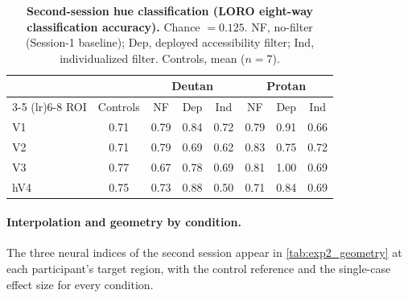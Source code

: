 \begin{table}[tb]
  \centering
  \caption{\textbf{Second-session hue classification (LORO eight-way classification accuracy).} Chance $= 0.125$. NF, no-filter (Session-1 baseline); Dep, deployed accessibility filter; Ind, individualized filter. Controls, mean ($n = 7$).}
  \label{tab:exp2_loro}
  \begin{tabular}{lccccccc}
    \toprule
     & & \multicolumn{3}{c}{Deutan} & \multicolumn{3}{c}{Protan} \\
    \cmidrule(lr){3-5} \cmidrule(lr){6-8}
    ROI & Controls & NF & Dep & Ind & NF & Dep & Ind \\
    \midrule
    V1  & 0.71 & 0.79 & 0.84 & 0.72 & 0.79 & 0.91 & 0.66 \\
    V2  & 0.71 & 0.79 & 0.69 & 0.62 & 0.83 & 0.75 & 0.72 \\
    V3  & 0.77 & 0.67 & 0.78 & 0.69 & 0.81 & 1.00 & 0.69 \\
    hV4 & 0.75 & 0.73 & 0.88 & 0.50 & 0.71 & 0.84 & 0.69 \\
    \bottomrule
  \end{tabular}
\end{table}

\paragraph{Interpolation and geometry by condition.}
The three neural indices of the second session appear in \cref{tab:exp2_geometry} at each participant's target region, with the control reference and the single-case effect size for every condition.

